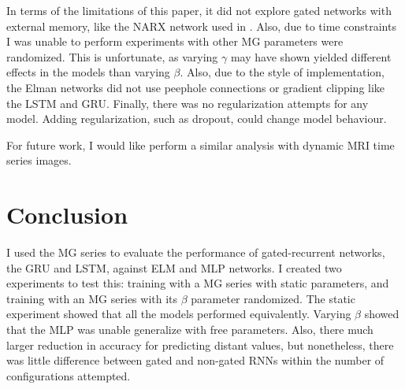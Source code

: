 \documentclass[11pt]{article}
\begin{document}
In terms of the limitations of this paper, it did not explore gated
networks with external memory, like the NARX network used in \cite{Farsa}. Also, due to
time constraints I was unable to perform experiments with other MG
parameters were randomized. This is unfortunate, as varying $\gamma$
may have shown yielded different effects in the models than varying $\beta$. Also, due to
the style of implementation, the Elman networks did not use peephole
connections or gradient clipping like the LSTM and GRU. Finally, there
was no regularization attempts for any model. Adding regularization, such as dropout, could change model behaviour.

For future work, I would like perform a similar analysis with dynamic
MRI time series images.

 \section{Conclusion}
I used the MG series to evaluate the performance of gated-recurrent
networks, the GRU and LSTM, against ELM and MLP networks. I created
two  experiments to test this: training with a MG series with
static parameters, and training with an MG series with its $\beta$
parameter randomized. The static experiment showed that all the models performed
equivalently. Varying $\beta$  showed that the MLP was unable generalize with free
parameters. Also, there much larger reduction in accuracy for
predicting distant values, but nonetheless, there was little
difference between gated and non-gated RNNs within the number
of configurations attempted.



\end{document}
